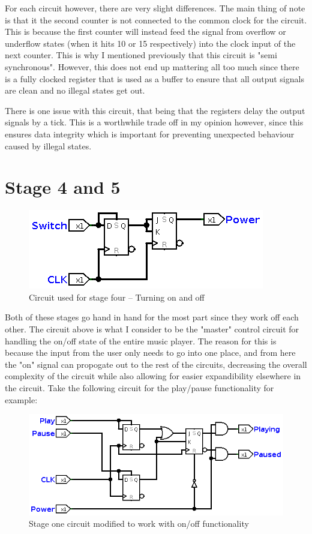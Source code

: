 \documentclass[11pt]{scrartcl}
\begin{document}
\bigskip

For each circuit however, there are very slight differences. The main thing of note is that it the
second counter is not connected to the common clock for the circuit. This is because the first
counter will instead feed the signal from overflow or underflow states (when it hits 10 or 15
respectively) into the clock input of the next counter. This is why I mentioned previously that
this circuit is "semi synchronous". However, this does not end up mattering all too much since
there is a fully clocked register that is used as a buffer to ensure that all output signals are
clean and no illegal states get out.

\bigskip

There is one issue with this circuit, that being that the registers delay the output signals by a
tick. This is a worthwhile trade off in my opinion however, since this ensures data integrity which
is important for preventing unexpected behaviour caused by illegal states.

\section*{Stage 4 and 5}
\begin{figure}[h]
    \centering
    \includegraphics[scale=0.5]{images/stagefour.png}
    \caption{Circuit used for stage four -- Turning on and off}
\end{figure}
Both of these stages go hand in hand for the most part since they work off each other.
The circuit above is what I consider to be the "master" control circuit for handling
the on/off state of the entire music player. The reason for this is because the input from
the user only needs to go into one place, and from here the "on" signal can propogate out
to the rest of the circuits, decreasing the overall complexity of the circuit while also
allowing for easier expandibility elsewhere in the circuit. Take the following circuit
for the play/pause functionality for example:
\begin{figure}[h]
    \centering
    \includegraphics[scale=0.5]{images/stageonenew.png}
    \caption{Stage one circuit modified to work with on/off functionality}
\end{figure}
\end{document}
